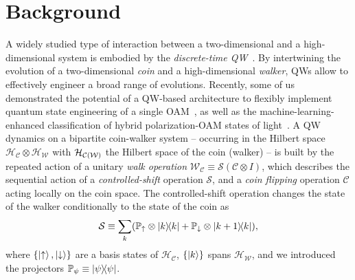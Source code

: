 \documentclass[
	aps, pra,
	superscriptaddress, twocolumn,
	floatfix,
	10pt
]{revtex4-1}
\newcommand{\parTitle}[1]{\noindent{\color{Mahogany}(\emph{#1})}}
\newcommand{\PP}{\mathbb{P}}
\newcommand{\calC}{{\mathcal{C}}}
\newcommand{\calH}{{\mathcal{H}}}
\newcommand{\calS}{{\mathcal{S}}}
\newcommand{\calW}{{\mathcal{W}}}
\newcommand{\HC}{\calH_\calC}
\newcommand{\HW}{\calH_\calW}
\newcommand{\LI}[1]{\highlight{(LI: \textit{#1})}}
\renewcommand{\parTitle}[1]{}
\begin{document}


\section{Background}
\label{sec:overview}

\parTitle{Background on QWs}
A widely studied type of interaction between a two-dimensional and a high-dimensional system is embodied by the \textit{discrete-time QW}~\cite{aharonov1993quantum,nayak2000quantum,ambainis2001onedimensional,Kempe2003quantum,venegas-andraca2012quantum}.
By intertwining the evolution of a two-dimensional \textit{coin} and a high-dimensional \textit{walker}, QWs allow to effectively engineer a broad range of evolutions.
Recently, some of us demonstrated the potential of a QW-based architecture to flexibly implement quantum state engineering of a single OAM~\cite{innocenti2017quantum,giordani2018experimental}, as well as the machine-learning-enhanced classification of hybrid polarization-OAM states of light~\cite{giordani2020machine}.
A QW dynamics on a bipartite coin-walker system -- occurring in the Hilbert space $\HC\otimes\HW$ with ${\cal H}_{{\cal C}({\cal W})}$ the Hilbert space of the coin (walker) -- is built by the repeated action of a unitary \textit{walk operation} $\calW_\calC\equiv \calS(\calC\otimes I)$, which describes the sequential action of a \textit{controlled-shift} operation $\calS$, and a \textit{coin flipping} operation $\calC$ acting locally on the coin space.
The controlled-shift operation changes the state of the walker conditionally to the state of the coin as
\begin{equation}
    \calS \equiv \sum_k (
        \PP_\uparrow\otimes \ketbra{k}{k} +
        \PP_\downarrow\otimes \ketbra{k+1}{k}
    ),
\end{equation}
where $\{\ket\uparrow,\ket\downarrow\}$ are a basis states of $\HC$, $\{\ket k\}$ spans $\HW$, and we introduced the projectors $\PP_\psi\equiv\ketbra\psi$.
\end{document}
